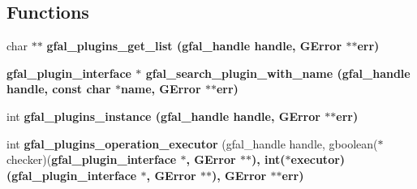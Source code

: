 \subsection*{Functions}
\begin{CompactItemize}
\item 
char $\ast$$\ast$ \bf{gfal\_\-plugins\_\-get\_\-list} (gfal\_\-handle handle, GError $\ast$$\ast$err)
\item 
\bf{gfal\_\-plugin\_\-interface} $\ast$ \bf{gfal\_\-search\_\-plugin\_\-with\_\-name} (gfal\_\-handle handle, const char $\ast$name, GError $\ast$$\ast$err)
\item 
int \bf{gfal\_\-plugins\_\-instance} (gfal\_\-handle handle, GError $\ast$$\ast$err)
\item 
int \textbf{gfal\_\-plugins\_\-operation\_\-executor} (gfal\_\-handle handle, gboolean($\ast$checker)(\bf{gfal\_\-plugin\_\-interface} $\ast$, GError $\ast$$\ast$), int($\ast$executor)(\bf{gfal\_\-plugin\_\-interface} $\ast$, GError $\ast$$\ast$), GError $\ast$$\ast$err)\label{gfal__common__plugin_8c_03cfec9717f9977a6e738574eb1f9ba4}


\end{CompactItemize}

